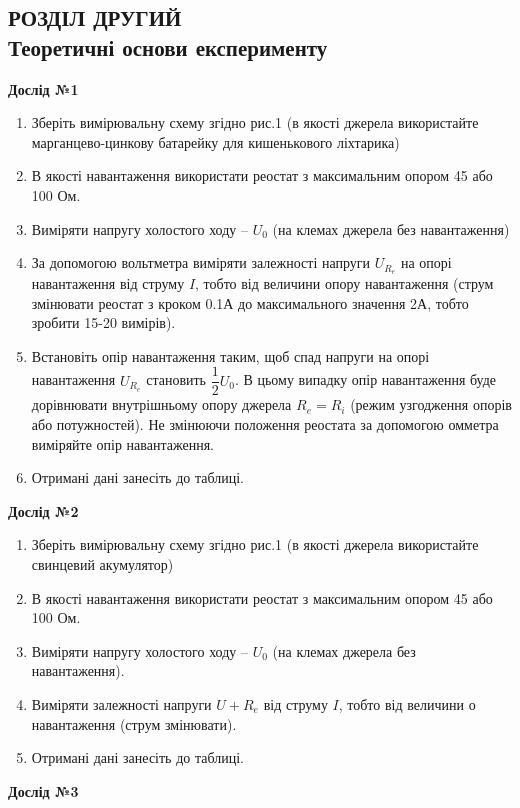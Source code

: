 \documentclass[a4paper,12pt]{article}
\newcommand{\ri}{R_i}
\newcommand{\re}{R_e}
\newcommand{\uo}{U_0}
\begin{document}
	
	\newpage
	
	
	\begin{center}
		\section* {РОЗДІЛ ДРУГИЙ\\Теоретичні основи експерименту}
	\end{center}
	\textbf{Дослід №1 }
	\begin{enumerate}
		\item Зберіть вимірювальну схему згідно рис.1 (в якості джерела використайте марганцево-цинкову батарейку для кишенькового ліхтарика) 
		\item В якості навантаження використати реостат з максимальним опором 45 або 100 Ом. 
		\item Виміряти напругу холостого ходу – $\uo$ (на клемах джерела без навантаження) 
		\item За допомогою вольтметра виміряти залежності напруги $U_{\re}$ на опорі навантаження від струму $I$, тобто від величини опору навантаження (струм змінювати реостат з кроком 0.1А до максимального значення 2А, тобто зробити 15-20 вимірів). 
		\item Встановіть опір навантаження таким, щоб спад напруги на опорі навантаження $U_{\re}$
		становить $\dfrac{1}{2}\uo$. В цьому випадку опір навантаження буде дорівнювати внутрішньому опору джерела $\re=\ri$ (режим узгодження опорів або потужностей). Не змінюючи положення реостата за допомогою омметра виміряйте опір навантаження. 
		\item Отримані дані занесіть до таблиці. 
	\end{enumerate}
	\textbf{Дослід №2} 
	\begin{enumerate}
		\item Зберіть вимірювальну схему згідно рис.1 (в якості джерела використайте свинцевий акумулятор)  
		\item В якості навантаження використати реостат з максимальним опором 45 або 100 Ом. 
		\item Виміряти напругу холостого ходу – $\uo$ (на клемах джерела без навантаження). 
		\item Виміряти залежності напруги $U+{\re}$ від струму $I$, тобто від величини о навантаження (струм змінювати). 
		\item Отримані дані занесіть до таблиці. 
	\end{enumerate}
	\textbf{Дослід №3} 
\end{document}
